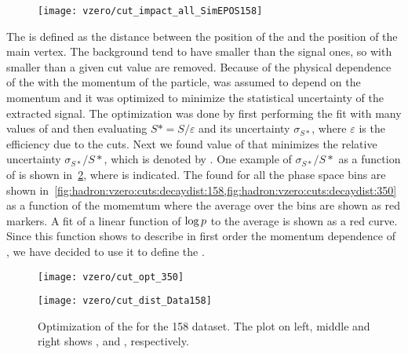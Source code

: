 \begin{figure}
  \centering
  \texttt{[image: vzero/cut\_impact\_all\_SimEPOS158]}
  
  \caption{}
  \label{fig:hadron:vzero:cuts:impact}
\end{figure}

The \decaydist is defined as the distance between the position
of the \vzero and the position of the main vertex.
The background \vzeros tend to have smaller \decaydist than
the signal ones, so \vzero with \decaydist
smaller than a given cut value \decaydistmin are removed.
Because of the physical dependence of the \decaydist with
the momentum of the particle, \decaydistmin was assumed to
depend on the \vzero momentum and it was optimized to minimize
the statistical uncertainty of the extracted signal.
The optimization was done by first performing the \minv fit
with many values of \decaydistmin and then evaluating
$S* = S/\varepsilon$ and its uncertainty $\sigma_{S*}$,
where $\varepsilon$ is the efficiency due to the \vzero cuts.
Next we found value of \decaydistmin that minimizes the
relative uncertainty $\sigma_{S*}/S*$, which is denoted by \decaydistopt.
One example of $\sigma_{S*}/S*$ as a function of \decaydistmin is
shown in~\cref{fig:hadron:vzero:cuts:decaydist:example}, where \decaydistopt is indicated.
The \decaydistopt found for all the phase space bins
are shown in~\cref{fig:hadron:vzero:cuts:decaydist:158,fig:hadron:vzero:cuts:decaydist:350}
as a function of the \vzero momemtum
where the average over the \pT bins are shown as red markers.
A fit of a linear function of $\log p$ to the average \decaydistopt
is shown as a red curve. Since this function shows to describe
in first order the momentum dependence of \decaydistopt,
we have decided to use it to define the \decaydistmin.

\begin{figure}
  \centering
  \texttt{[image: vzero/cut\_opt\_350]}
  
  \caption{}
  \label{fig:hadron:vzero:cuts:decaydist:example}
\end{figure}

\begin{figure}
  \centering
  \texttt{[image: vzero/cut\_dist\_Data158]}
  
  \caption{Optimization of the \decaydistmin for the 158 \GeVc dataset. The plot on left, middle and right shows \lamb, \antilamb and \kzeros, respectively.}
  \label{fig:hadron:vzero:cuts:decaydist:158}
\end{figure}

